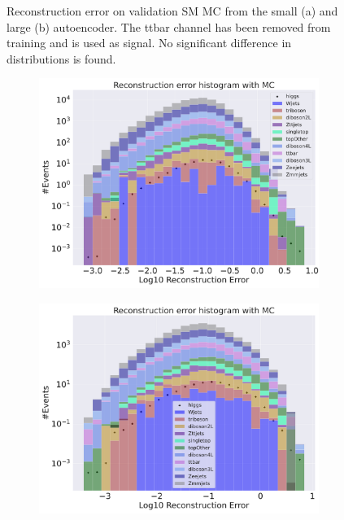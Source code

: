 \begin{figure}[H]
\begin{subfigure}{.45\textwidth}
        \caption{ }
        \label{fig:ae_big_ttbar}
    \end{subfigure}
    \hfill 
    \caption[AE | Reconstruction error using ttbar channel as signal]{Reconstruction error on validation SM MC from the small (a) and large (b) autoencoder. The ttbar channel has been removed from training and 
    is used as signal. No significant difference in distributions is found.  }
    \label{fig:ae_big_channel_3}
\end{figure}



\begin{figure}[H]
    \centering
    \begin{subfigure}{.45\textwidth}
        \includegraphics[width=\textwidth]{Figures/VAE_testing/small/b_data_recon_big_rm3_feats_sig_Higgs.pdf}
        \caption{}
        \label{fig:vae_small_higgs}
    \end{subfigure}
    \hfill 
    \begin{subfigure}{.45\textwidth}
        \includegraphics[width=\textwidth]{Figures/VAE_testing/big/b_data_recon_big_rm3_feats_sig_higgs.pdf}

\end{subfigure}
\end{figure}
